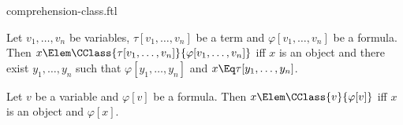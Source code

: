 \documentclass{stex}
\begin{document}
\begin{smodule}{comprehension-class.ftl}


\begin{fakeforthel}
  \begin{axiom*}
    Let $v_1,\dots,v_n$ be variables, $\tau[v_1,\dots,v_n]$ be a term and $\varphi[v_1,\dots,v_n]$ be a formula.
    Then $x \Elem \CClass{\tau[v_1,\dots,v_n]}{\varphi[v_1,\dots,v_n]}$ iff
    $x$ is an object and there exist $y_1,\dots,y_n$ such that $\varphi[y_1,\dots,y_n]$ and $x \Eq \tau[y_1,\dots,y_n]$.
  \end{axiom*}
\end{fakeforthel}

\begin{fakeforthel}
  \begin{proposition*}
    Let $v$ be a variable and $\varphi[v]$ be a formula.
    Then $x \Elem \CClass{v}{\varphi[v]}$ iff $x$ is an object and $\varphi[x]$.
  \end{proposition*}
\end{fakeforthel}

\end{smodule}
\end{document}
